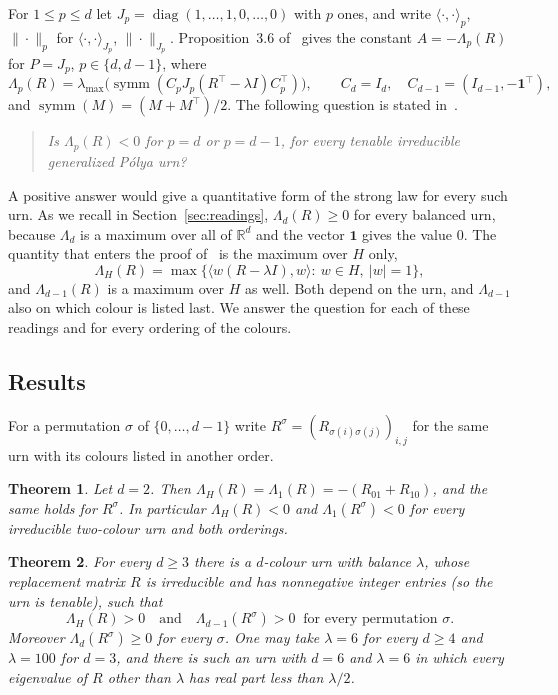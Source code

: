 \documentclass[11pt]{amsart}
\newtheorem{theorem}{Theorem}[section]
\theoremstyle{definition}
\theoremstyle{remark}
\newcommand{\R}{\mathbb R}
\newcommand{\one}{\mathbf 1}
\newcommand{\symm}{\operatorname{symm}}
\begin{document}
For $1\le p\le d$ let $J_p=\operatorname{diag}(1,\dots,1,0,\dots,0)$ with $p$ ones, and write $\langle\cdot,\cdot\rangle_p$, $\|\cdot\|_p$ for $\langle\cdot,\cdot\rangle_{J_p}$, $\|\cdot\|_{J_p}$. Proposition~3.6 of~\cite[p.~13]{NP} gives the constant $A=-\Lambda_p(R)$ for $P=J_p$, $p\in\{d,d-1\}$, where
\[
\Lambda_p(R)=\lambda_{\max}\big(\symm(C_pJ_p(R^{\top}-\lambda I)C_p^{\top})\big),\qquad C_d=I_d,\quad C_{d-1}=(I_{d-1},-\one^{\top}),
\]
and $\symm(M)=(M+M^{\top})/2$. The following question is stated in~\cite[Remark~3.7, p.~14]{NP}.

\begin{quote}
\emph{Is $\Lambda_p(R)<0$ for $p=d$ or $p=d-1$, for every tenable irreducible generalized P\'olya urn?}
\end{quote}

\noindent A positive answer would give a quantitative form of the strong law for every such urn. As we recall in Section~\ref{sec:readings}, $\Lambda_d(R)\ge 0$ for every balanced urn, because $\Lambda_d$ is a maximum over all of $\R^d$ and the vector $\one$ gives the value $0$. The quantity that enters the proof of~\cite[Theorem~1.2]{NP} is the maximum over $H$ only,
\[
\Lambda_H(R)=\max\big\{\langle w(R-\lambda I),w\rangle:\ w\in H,\ |w|=1\big\},
\]
and $\Lambda_{d-1}(R)$ is a maximum over $H$ as well. Both depend on the urn, and $\Lambda_{d-1}$ also on which colour is listed last. We answer the question for each of these readings and for every ordering of the colours.

\subsection*{Results}
For a permutation $\sigma$ of $\{0,\dots,d-1\}$ write $R^\sigma=(R_{\sigma(i)\sigma(j)})_{i,j}$ for the same urn with its colours listed in another order.

\begin{theorem}\label{thm:two}
Let $d=2$. Then $\Lambda_H(R)=\Lambda_1(R)=-(R_{01}+R_{10})$, and the same holds for $R^\sigma$. In particular $\Lambda_H(R)<0$ and $\Lambda_1(R^\sigma)<0$ for every irreducible two-colour urn and both orderings.
\end{theorem}

\begin{theorem}\label{thm:neg}
For every $d\ge 3$ there is a $d$-colour urn with balance $\lambda$, whose replacement matrix $R$ is irreducible and has nonnegative integer entries (so the urn is tenable), such that
\[
\Lambda_H(R)>0\quad\text{and}\quad\Lambda_{d-1}(R^\sigma)>0\ \text{ for every permutation }\sigma .
\]
Moreover $\Lambda_d(R^\sigma)\ge 0$ for every $\sigma$. One may take $\lambda=6$ for every $d\ge 4$ and $\lambda=100$ for $d=3$, and there is such an urn with $d=6$ and $\lambda=6$ in which every eigenvalue of $R$ other than $\lambda$ has real part less than $\lambda/2$.
\end{theorem}
\end{document}
